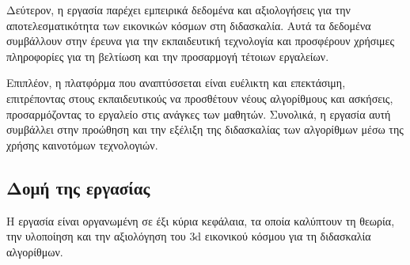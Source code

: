 \pagebreak
\showheader

Δεύτερον, η εργασία παρέχει εμπειρικά δεδομένα και αξιολογήσεις για την αποτελεσματικότητα των εικονικών κόσμων στη διδασκαλία. Αυτά τα δεδομένα συμβάλλουν στην έρευνα για την εκπαιδευτική τεχνολογία και προσφέρουν χρήσιμες πληροφορίες για τη βελτίωση και την προσαρμογή τέτοιων εργαλείων.

Επιπλέον, η πλατφόρμα που αναπτύσσεται είναι ευέλικτη και επεκτάσιμη, επιτρέποντας στους εκπαιδευτικούς να προσθέτουν νέους αλγορίθμους και ασκήσεις, προσαρμόζοντας το εργαλείο στις ανάγκες των μαθητών. Συνολικά, η εργασία αυτή συμβάλλει στην προώθηση και την εξέλιξη της διδασκαλίας των αλγορίθμων μέσω της χρήσης καινοτόμων τεχνολογιών.


\subsection{Δομή της εργασίας}

Η εργασία είναι οργανωμένη σε έξι κύρια κεφάλαια, τα οποία καλύπτουν τη θεωρία, την υλοποίηση και την αξιολόγηση του \acrshort{3d} εικονικού κόσμου για τη διδασκαλία αλγορίθμων.


